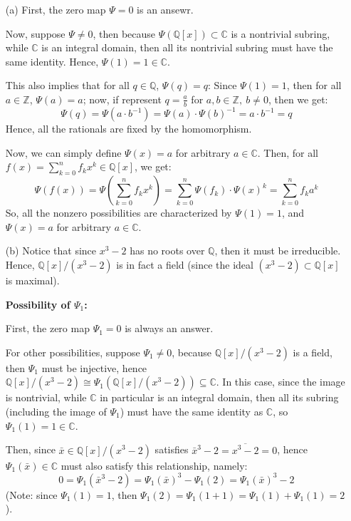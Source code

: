 \documentclass{article}
\begin{document}
\begin{itemize}
    \item[(a)] First, the zero map $\Psi=0$ is an ansewr.
    
    Now, suppose $\Psi\neq 0$, then because $\Psi(\mathbb{Q}[x])\subset \mathbb{C}$ is a nontrivial subring, while $\mathbb{C}$ is an integral domain, then all its nontrivial subring must have the same identity.
    Hence, $\Psi(1)=1\in\mathbb{C}$. 

    This also implies that for all $q\in\mathbb{Q}$, $\Psi(q)=q$: Since $\Psi(1)=1$, then for all $a\in \mathbb{Z}$, $\Psi(a)=a$;
    now, if represent $q=\frac{a}{b}$ for $a,b\in\mathbb{Z},\ b\neq 0$, then we get:
    $$\Psi(q)=\Psi(a\cdot b^{-1})=\Psi(a)\cdot\Psi(b)^{-1}=a\cdot b^{-1}=q$$
    Hence, all the rationals are fixed by the homomorphism.

    Now, we can simply define $\Psi(x)=a$ for arbitrary $a\in\mathbb{C}$. Then, for all $f(x)=\sum_{k=0}^{n}f_kx^k\in\mathbb{Q}[x]$, we get:
    $$\Psi(f(x))=\Psi\left(\sum_{k=0}^{n}f_kx^k\right)=\sum_{k=0}^{n}\Psi(f_k)\cdot\Psi(x)^k=\sum_{k=0}^{n}f_ka^k$$
    So, all the nonzero possibilities are characterized by $\Psi(1)=1$, and $\Psi(x)=a$ for arbitrary $a\in\mathbb{C}$.

    \hfil

    \item[(b)] Notice that since $x^3-2$ has no roots over $\mathbb{Q}$, then it must be irreducible. Hence, $\mathbb{Q}[x]/(x^3-2)$ is in fact a field (since the ideal $(x^3-2)\subset \mathbb{Q}[x]$ is maximal).
    
    \textbf{Possibility of $\Psi_1$:}
    
    First, the zero map $\Psi_1=0$ is always an answer. 
    
    For other possibilities, suppose $\Psi_1\neq 0$, because $\mathbb{Q}[x]/(x^3-2)$ is a field, then $\Psi_1$ must be injective, hence $\mathbb{Q}[x]/(x^3-2)\cong \Psi_1(\mathbb{Q}[x]/(x^3-2))\subseteq \mathbb{C}$.
    In this case, since the image is nontrivial, while $\mathbb{C}$ in particular is an integral domain, then all its subring (including the image of $\Psi_1$) must have the same identity as $\mathbb{C}$, so $\Psi_1(1)=1\in\mathbb{C}$.

    Then, since $\bar{x}\in \mathbb{Q}[x]/(x^3-2)$ satisfies $\bar{x}^3-2=\overline{x^3-2}=0$, hence $\Psi_1(\bar{x})\in\mathbb{C}$ must also satisfy this relationship, namely:
    $$0=\Psi_1(\bar{x}^3-2)=\Psi_1(\bar{x})^3-\Psi_1(2)=\Psi_1(\bar{x})^3-2$$
    (Note: since $\Psi_1(1)=1$, then $\Psi_1(2)=\Psi_1(1+1)=\Psi_1(1)+\Psi_1(1)=2$).


\end{itemize}
\end{document}
